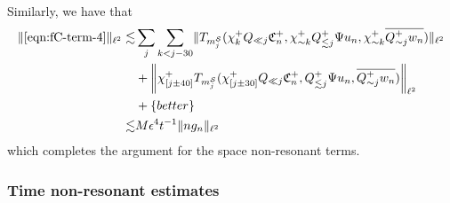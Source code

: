 \documentclass[letterpaper, reqno,final]{amsart}
\newcommand{\cS}{\mathcal{S}}
\newcommand{\fC}{\mathfrak{C}}
\newcommand{\btext}[1]{\left\{\textup{#1}\right\}}
\newcommand{\bbetter}{\btext{better}}
\begin{document}
Similarly, we have that
\begin{equation*}\begin{split}
    \lVert \eqref{eqn:fC-term-4} \rVert_{\ell^2} \lesssim& \sum_j \sum_{k < j - 30} \lVert T_{m_j^\cS}(\chi_k^+ Q_{\ll j} \fC_n^+, \chi_{\sim k}^+ Q_{\lesssim j}^+ \Psi u_n, \chi_{\sim k}^+ \overline{Q_{\sim j}^+ w_n}) \rVert_{\ell^2}\\
    &+ \biggl\lVert \chi_{[j \pm 40]}^+ T_{m_j^\cS}(\chi_{[j \pm 30]}^+ Q_{\ll j} \fC_n^+,  Q_{\lesssim j}^+ \Psi u_n, \overline{Q_{\sim j}^+ w_n}) \biggr\rVert_{\ell^2}\\
    &+ \bbetter\\
    \lesssim& M\epsilon^4 t^{-1} \lVert ng_n \rVert_{\ell^2}
\end{split}
\end{equation*}
which completes the argument for the space non-resonant terms.

\subsubsection{Time non-resonant estimates}\label{sec:ng_n-tnr}
\end{document}

